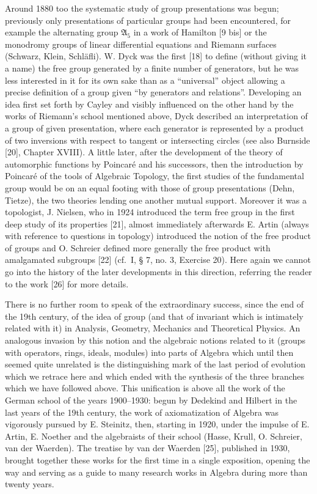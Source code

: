 Around 1880 too the systematic study of group presentations was begun; previously only presentations of particular groups had been encountered, for example the alternating group \(\mathfrak{A}_5\) in a work of Hamilton {[}9 bis{]} or the monodromy groups of linear differential equations and Riemann surfaces (Schwarz, Klein, Schläfli). W. Dyck was the first {[}18{]} to define (without giving it a name) the free group generated by a finite number of generators, but he was less interested in it for its own sake than as a ``universal'' object allowing a precise definition of a group given ``by generators and relations''. Developing an idea first set forth by Cayley and visibly influenced on the other hand by the works of Riemann's school mentioned above, Dyck described an interpretation of a group of given presentation, where each generator is represented by a product of two inversions with respect to tangent or intersecting circles (see also Burnside {[}20{]}, Chapter XVIII). A little later, after the development of the theory of automorphic functions by Poincaré and his successors, then the introduction by Poincaré of the tools of Algebraic Topology, the first studies of the fundamental group would be on an equal footing with those of group presentations (Dehn, Tietze), the two theories lending one another mutual support. Moreover it was a topologist, J. Nielsen, who in 1924 introduced the term free group in the first deep study of its properties {[}21{]}, almost immediately afterwards E. Artin (always with reference to questions in topology) introduced the notion of the free product of groups and O. Schreier defined more generally the free product with amalgamated subgroups {[}22{]} (cf.~I, § 7, no. 3, Exercise 20). Here again we cannot go into the history of the later developments in this direction, referring the reader to the work {[}26{]} for more details.

There is no further room to speak of the extraordinary success, since the end of the 19th century, of the idea of group (and that of invariant which is intimately related with it) in Analysis, Geometry, Mechanics and Theoretical Physics. An analogous invasion by this notion and the algebraic notions related to it (groups with operators, rings, ideals, modules) into parts of Algebra which until then seemed quite unrelated is the distinguishing mark of the last period of evolution which we retrace here and which ended with the synthesis of the three branches which we have followed above. This unification is above all the work of the German school of the years 1900--1930: begun by Dedekind and Hilbert in the last years of the 19th century, the work of axiomatization of Algebra was vigorously pursued by E. Steinitz, then, starting in 1920, under the impulse of E. Artin, E. Noether and the algebraists of their school (Hasse, Krull, O. Schreier, van der Waerden). The treatise by van der Waerden {[}25{]}, published in 1930, brought together these works for the first time in a single exposition, opening the way and serving as a guide to many research works in Algebra during more than twenty years.

